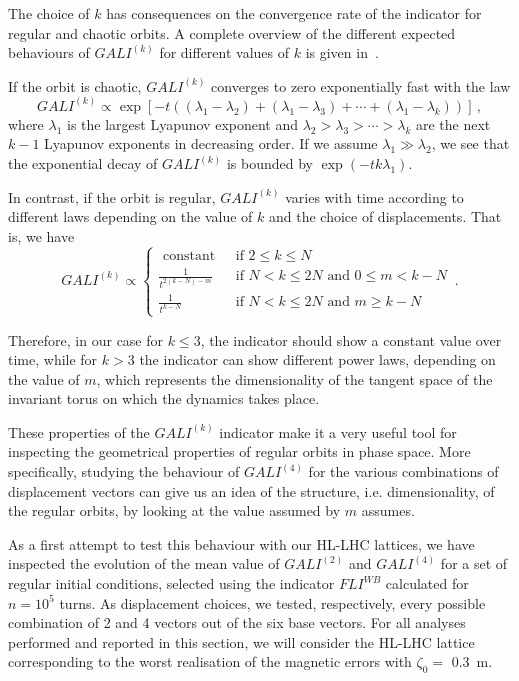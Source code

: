 The choice of $k$ has consequences on the convergence rate of the indicator for regular and chaotic orbits. A complete overview of the different expected behaviours of $GALI^{(k)}$ for different values of $k$ is given in~\cite{SKOKOS200730}.

If the orbit is chaotic, $GALI^{(k)}$ converges to zero exponentially fast with the law
\begin{equation}
    GALI^{(k)} \propto \exp\left[-t\left((\lambda_1 - \lambda_2)+(\lambda_1 - \lambda_3)+\cdots+(\lambda_1 - \lambda_k)\right)\right] \,,
\end{equation}
where $\lambda_1$ is the largest Lyapunov exponent and $\lambda_2> \lambda_3>\cdots>\lambda_k$ are the next $k-1$ Lyapunov exponents in decreasing order. If we assume $\lambda_1 \gg \lambda_2$, we see that the exponential decay of $GALI^{(k)}$ is bounded by $\exp(-tk\lambda_1)$.

In contrast, if the orbit is regular, $GALI^{(k)}$ varies with time according to different laws depending on the value of $k$ and the choice of displacements. That is, we have
\begin{equation}
    GALI^{(k)} \propto \begin{cases}\text { constant } & \text { if } 2 \leq k \leq N \\ \frac{1}{t^{2(k-N)-m}} & \text { if } N<k \leq 2 N \text { and } 0 \leq m<k-N \\ \frac{1}{t^{k-N}} & \text { if } N<k \leq 2 N \text { and } m \geq k-N\end{cases} \,.
\end{equation}

Therefore, in our case for $k\leq3$, the indicator should show a constant value over time, while for $k>3$ the indicator can show different power laws, depending on the value of $m$, which represents the dimensionality of the tangent space of the invariant torus on which the dynamics takes place.

These properties of the $GALI^{(k)}$ indicator make it a very useful tool for inspecting the geometrical properties of regular orbits in phase space. More specifically, studying the behaviour of $GALI^{(4)}$ for the various combinations of displacement vectors can give us an idea of the structure, i.e. dimensionality, of the regular orbits, by looking at the value assumed by $m$ assumes.

As a first attempt to test this behaviour with our HL-LHC lattices, we have inspected the evolution of the mean value of $GALI^{(2)}$ and $GALI^{(4)}$ for a set of regular initial conditions, selected using the indicator $FLI^{WB}$ calculated for $n=10^5$ turns. As displacement choices, we tested, respectively, every possible combination of 2 and 4 vectors out of the six base vectors. For all analyses performed and reported in this section, we will consider the HL-LHC lattice corresponding to the worst realisation of the magnetic errors with $\zeta_0=$ \SI{0.3}{\metre}.

